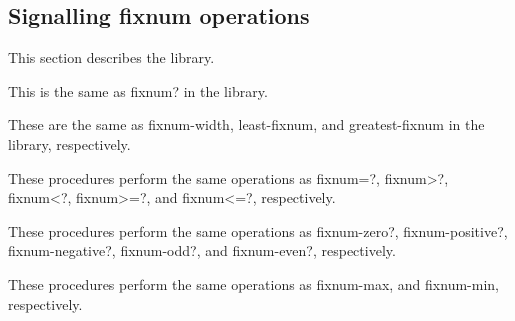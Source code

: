 \subsection{Signalling fixnum operations}

This section describes the  library.

\begin{entry}{%
}

This is the same as {\cf fixnum?} in the  library.
\end{entry}

\begin{entry}{%
}

These are the same as {\cf fixnum-width},
{\cf least-fixnum}, and {\cf greatest-fixnum} in the  library,
respectively.
\end{entry}

\begin{entry}{%
}

These procedures perform the same operations as {\cf fixnum=?}, {\cf
  fixnum>?}, {\cf fixnum<?}, {\cf fixnum>=?}, and {\cf fixnum<=?},
respectively.
\end{entry}

\begin{entry}{%
}

These procedures perform the same operations as {\cf fixnum-zero?},
{\cf fixnum-positive?}, {\cf fixnum-negative?}, {\cf fixnum-odd?}, and
{\cf fixnum-even?}, respectively.
\end{entry}

\begin{entry}{%
}

These procedures perform the same operations as {\cf fixnum-max},
and {\cf fixnum-min}, respectively.
\end{entry}

